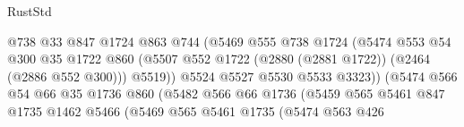 \begin{lexlean}{RustStd}
\begin{coremodule}
                                          @738
                                          @33
                                          @847
                                          @1724
                                          @863
                                          @744
                                          (@5469
                                            @555
                                            @738
                                            @1724
                                            (@5474
                                              @553
                                              @54
                                              @300
                                              @35
                                              @1722
                                              @860
                                              (@5507
                                                @552
                                                @1722
                                                (@2880 (@2881 @1722))
                                                (@2464 (@2886 @552 @300)))
                                              @5519))
                                          @5524
                                          @5527
                                          @5530
                                          @5533
                                          @3323))
                                      (@5474
                                        @566
                                        @54
                                        @66
                                        @35
                                        @1736
                                        @860
                                        (@5482
                                          @566
                                          @66
                                          @1736
                                          (@5459
                                            @565
                                            @5461
                                            @847
                                            @1735
                                            @1462
                                            @5466
                                            (@5469
                                              @565
                                              @5461
                                              @1735
                                              (@5474
                                                @563
                                                @426

\end{coremodule}
\end{lexlean}

